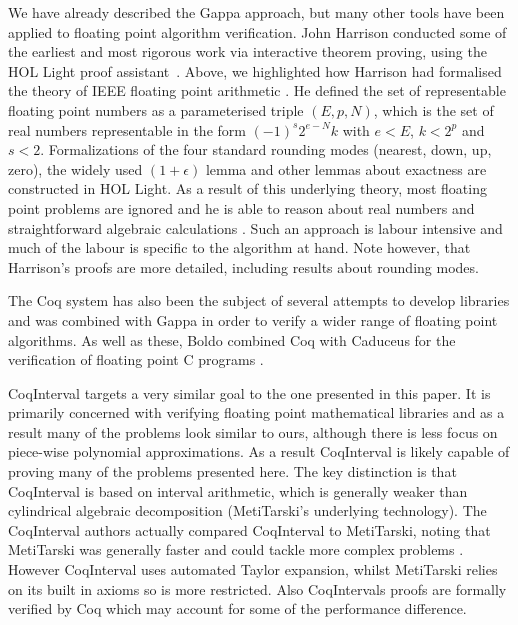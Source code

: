 \documentclass{fac}
\begin{document}
We have already described the Gappa approach, but many other tools have been applied to floating point algorithm verification. John Harrison conducted some of the earliest and most rigorous work via interactive theorem proving, using the HOL Light proof assistant~\cite{harrison1997floating}. Above, we highlighted how Harrison had formalised the theory of IEEE floating point arithmetic \cite{harrison1999machine}. He defined the set of representable floating point numbers as a parameterised triple $(E,p,N)$, which is the set of real numbers representable in the form $(-1)^s 2^{e-N} k$ with $e<E$, $k<2^p$ and $s<2$. Formalizations of the four standard rounding modes (nearest, down, up, zero), the widely used $(1+\epsilon)$ lemma and other lemmas about exactness are constructed in HOL Light. As a result of this underlying theory, most floating point problems are ignored and he is able to reason about real numbers and straightforward algebraic calculations \cite{harrison1999machine}. Such an approach is labour intensive and much of the labour is specific to the algorithm at hand. Note however, that Harrison's proofs are more detailed, including results about rounding modes. 

 The Coq system has also been the subject of several attempts to develop libraries \cite{daumas2001generic,melquiond2012floating,boldo2011flocq} and was combined with Gappa \cite{boldo2009combining,daumas2010certification} in order to verify a wider range of floating point algorithms. As well as these, Boldo combined Coq with Caduceus for the verification of floating point C programs \cite{boldo2007formal}.
 
 CoqInterval \cite{martin2016proving} targets a very similar goal to the one presented in this paper. It is primarily concerned with verifying floating point mathematical libraries and as a result many of the problems look similar to ours, although there is less focus on piece-wise polynomial approximations. As a result CoqInterval is likely capable of proving many of the problems presented here. The key distinction is that CoqInterval is based on interval arithmetic, which is generally weaker than cylindrical algebraic decomposition (MetiTarski's underlying technology). The CoqInterval authors actually compared CoqInterval to MetiTarski, noting that MetiTarski was generally faster and could tackle more complex problems \cite{martin2016proving}. However CoqInterval uses automated Taylor expansion, whilst MetiTarski relies on its built in axioms so is more restricted. Also CoqIntervals proofs are formally verified by Coq which may account for some of the performance difference. 
 
\end{document}

